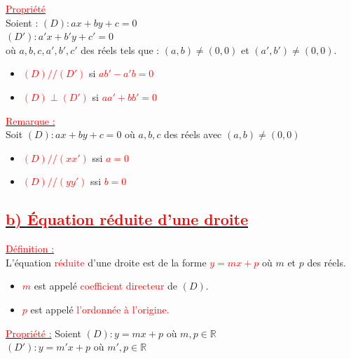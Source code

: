 \documentclass[12pt,a4paper]{article}
\begin{document}
\noindent \underline{\textcolor{red}{Propriété}} \\
Soient : $(D) : ax + by + c = 0$ \\
\indent \qquad $(D') : a'x + b'y + c' = 0$ \\
où $a, b, c, a', b', c'$ des réels tels que : $(a, b) \neq (0, 0)$ et $(a', b') \neq (0, 0)$.

\begin{itemize}
    \item[i)] \textcolor{red}{$(D) // (D')$} si \textcolor{red}{$ab' - a'b = 0$}
    \item[ii)] \textcolor{red}{$(D) \perp (D')$} si \textcolor{red}{$aa' + bb' = 0$}
\end{itemize}

\noindent \underline{\textcolor{red}{Remarque :}} \\
Soit $(D) : ax + by + c = 0$ où $a, b, c$ des réels avec $(a, b) \neq (0, 0)$
\begin{itemize}
    \item[i)] \textcolor{red}{$(D) // (xx')$} ssi \textcolor{red}{$a = 0$}
    \item[ ] \textcolor{red}{$(D) // (yy')$} ssi \textcolor{red}{$b = 0$}
\end{itemize}

\vspace{0.5cm}

\subsection*{\underline{\textcolor{red}{b) Équation réduite d'une droite}}}

\noindent \underline{\textcolor{red}{Définition :}} \\
L'équation \textcolor{red}{réduite} d'une droite est de la forme \textcolor{red}{$y = mx + p$} où $m$ et $p$ des réels.
\begin{itemize}
    \item \textcolor{red}{$m$} est appelé \textcolor{red}{coefficient directeur} de $(D)$.
    \item \textcolor{red}{$p$} est appelé \textcolor{red}{l'ordonnée à l'origine}.
\end{itemize}


\noindent \underline{\textcolor{red}{Propriété :}} Soient $(D) : y = mx + p$ où $m, p \in \mathbb{R}$ \\
\indent \qquad \qquad \qquad $(D') : y = m'x + p$ où $m', p \in \mathbb{R}$
\end{document}
